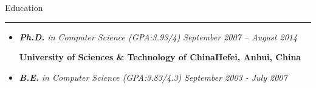 \documentclass[11pt,oneside]{article}
\newenvironment{ressection}[1]{
	{\fontfamily{phv}\selectfont\Large#1}
	
	\vspace{-8pt} \rule{\textwidth}{.5pt}
	
	\vspace{-4pt}
	\begin{itemize}
	\vspace{.5pt}
}{
	\end{itemize}
}
\newcommand{\resitem}[1]{
	\vspace{2pt}
	\item \begin{flushleft} #1 \end{flushleft}
}
\newcommand{\ressubitem}[1]{
	\vspace{-4pt}
	\item \begin{flushleft} #1 \end{flushleft}
}
\newcommand{\resbigitem}[3]{
	\vspace{-5pt}
	\item
	\textbf{#1} --- #2 \\
	{#3}
}
\newenvironment{ressubsec}[3]{
	\resbigitem{#1}{#2}{#3}
	\vspace{-4pt}
	\begin{itemize}
}{
	\end{itemize}
}
\begin{document}
\vspace{5pt}
\begin{ressection}{Education}
    \vspace{-5pt}
    \begin{flushleft}
        {\selectfont\Large\bf{{Stony Brook University}\hfill{Stony Brook, NY}}}
    \end{flushleft}
    \vspace{-15pt}
    \item {\emph{\textbf{Ph.D.} in Computer Science (GPA:3.93/4)} \hfill\emph{September 2007 -- August 2014}}
    \vspace{-4pt}
    \begin{itemize}
    \end{itemize}
	
		

    \vspace{-10pt}
    \begin{flushleft}
        {\selectfont\Large\bf{{University of Sciences \& Technology of China}\hfill{Hefei, Anhui, China}}}
    \end{flushleft}
    \vspace{-15pt}
    \item {\emph{\textbf{B.E.} in Computer Science (GPA:3.83/4.3)} \hfill\emph{September 2003 - July 2007}}


\end{ressection}
\end{document}
